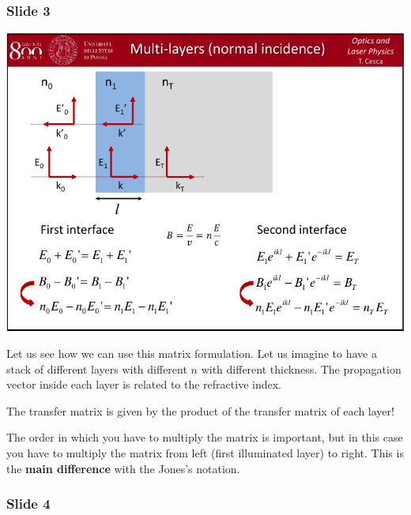\documentclass[../main/main.tex]{subfiles}
\begin{document}
\subsubsection*{Slide 3}

\begin{minipage}[]{0.5\linewidth}
\centering
\includegraphics[page=3,width=1\textwidth]{../lessons/pdf_file/06_lecture.pdf}
\end{minipage}
\hspace{0.3cm}\vspace{0.3cm}
\begin{minipage}[c]{0.47\linewidth}

Let us see how we can use this matrix formulation. Let us imagine to have a stack of different layers with different \( n \) with different thickness. The propagation vector inside each layer is related to the refractive index.

The transfer matrix is given by the product of the transfer matrix of each layer!

The order in which you have to multiply the matrix is important, but in this case you have to multiply the matrix from left (first illuminated layer) to right. This is the \textbf{main difference} with the Jones's notation.

\end{minipage}

\newpage

\subsubsection*{Slide 4}
\end{document}
